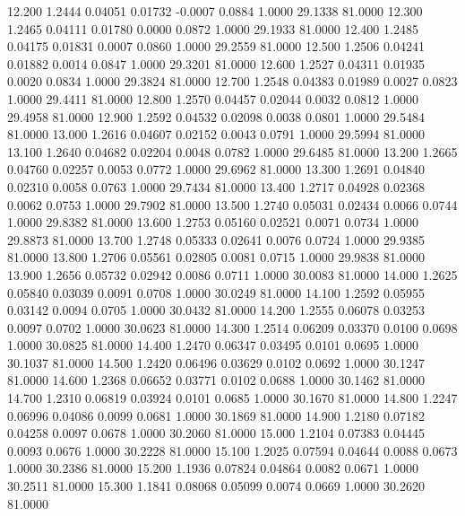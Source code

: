   12.200   1.2444   0.04051   0.01732  -0.0007   0.0884   1.0000  29.1338  81.0000
  12.300   1.2465   0.04111   0.01780   0.0000   0.0872   1.0000  29.1933  81.0000
  12.400   1.2485   0.04175   0.01831   0.0007   0.0860   1.0000  29.2559  81.0000
  12.500   1.2506   0.04241   0.01882   0.0014   0.0847   1.0000  29.3201  81.0000
  12.600   1.2527   0.04311   0.01935   0.0020   0.0834   1.0000  29.3824  81.0000
  12.700   1.2548   0.04383   0.01989   0.0027   0.0823   1.0000  29.4411  81.0000
  12.800   1.2570   0.04457   0.02044   0.0032   0.0812   1.0000  29.4958  81.0000
  12.900   1.2592   0.04532   0.02098   0.0038   0.0801   1.0000  29.5484  81.0000
  13.000   1.2616   0.04607   0.02152   0.0043   0.0791   1.0000  29.5994  81.0000
  13.100   1.2640   0.04682   0.02204   0.0048   0.0782   1.0000  29.6485  81.0000
  13.200   1.2665   0.04760   0.02257   0.0053   0.0772   1.0000  29.6962  81.0000
  13.300   1.2691   0.04840   0.02310   0.0058   0.0763   1.0000  29.7434  81.0000
  13.400   1.2717   0.04928   0.02368   0.0062   0.0753   1.0000  29.7902  81.0000
  13.500   1.2740   0.05031   0.02434   0.0066   0.0744   1.0000  29.8382  81.0000
  13.600   1.2753   0.05160   0.02521   0.0071   0.0734   1.0000  29.8873  81.0000
  13.700   1.2748   0.05333   0.02641   0.0076   0.0724   1.0000  29.9385  81.0000
  13.800   1.2706   0.05561   0.02805   0.0081   0.0715   1.0000  29.9838  81.0000
  13.900   1.2656   0.05732   0.02942   0.0086   0.0711   1.0000  30.0083  81.0000
  14.000   1.2625   0.05840   0.03039   0.0091   0.0708   1.0000  30.0249  81.0000
  14.100   1.2592   0.05955   0.03142   0.0094   0.0705   1.0000  30.0432  81.0000
  14.200   1.2555   0.06078   0.03253   0.0097   0.0702   1.0000  30.0623  81.0000
  14.300   1.2514   0.06209   0.03370   0.0100   0.0698   1.0000  30.0825  81.0000
  14.400   1.2470   0.06347   0.03495   0.0101   0.0695   1.0000  30.1037  81.0000
  14.500   1.2420   0.06496   0.03629   0.0102   0.0692   1.0000  30.1247  81.0000
  14.600   1.2368   0.06652   0.03771   0.0102   0.0688   1.0000  30.1462  81.0000
  14.700   1.2310   0.06819   0.03924   0.0101   0.0685   1.0000  30.1670  81.0000
  14.800   1.2247   0.06996   0.04086   0.0099   0.0681   1.0000  30.1869  81.0000
  14.900   1.2180   0.07182   0.04258   0.0097   0.0678   1.0000  30.2060  81.0000
  15.000   1.2104   0.07383   0.04445   0.0093   0.0676   1.0000  30.2228  81.0000
  15.100   1.2025   0.07594   0.04644   0.0088   0.0673   1.0000  30.2386  81.0000
  15.200   1.1936   0.07824   0.04864   0.0082   0.0671   1.0000  30.2511  81.0000
  15.300   1.1841   0.08068   0.05099   0.0074   0.0669   1.0000  30.2620  81.0000

